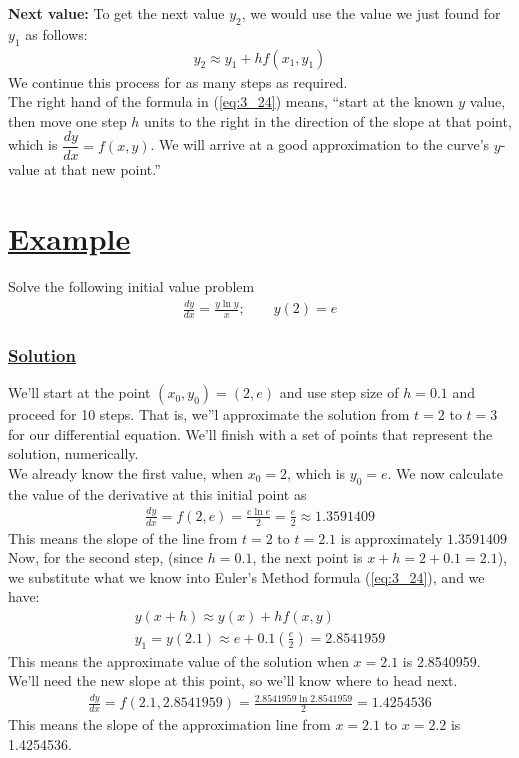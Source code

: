 \documentclass[11pt]{report}
\newcommand{\ubt}[1]{\textbf{\underline{#1}}}
\newcommand{\sps}{\\[0.2cm]}
\newcommand{\refn}[1]{(\ref{#1})}
\newcommand{\refx}[1]{\refn{eq:#1}}
\newcommand{\bt}[1]{\textbf{#1}}
\newcommand{\NI}{\noindent}
\newcommand{\solution}{\subsubsection{\ubt{Solution}}}
\newcommand{\eg}{\section*{\ubt{Example}}}
\begin{document}
	\NI \bt{Next value:} To get the next value $y_2$, we would use the value we just found for $y_1$ as follows:
	\begin{eqnarray*}
		y_2 \approx y_1 + hf(x_1,y_1)
	\end{eqnarray*}
	We continue this process for as many steps as required.\sps
	
	\NI The right hand of the formula in \refx{3_24} means, ``start at the known $y$ value, then move one step $h$ units to the right in the direction of the slope at that point, which is $\dfrac{dy}{dx}=f(x,y)$. We will arrive at a good approximation to the curve's $y$-value at that new point.''
	
	\eg
	Solve the following initial value problem
	\begin{eqnarray*}
		\frac{dy}{dx} = \frac{y\ln y}{x};\qquad y(2) = e
	\end{eqnarray*}
	
	\solution
	We'll start at the point $(x_0,y_0) = (2,e)$ and use step size of $h=0.1$ and proceed for 10 steps. That is, we''l approximate the solution from $t=2$ to $t=3$ for our differential equation. We'll finish with a set of points that represent the solution, numerically.\sps
	We already know the first value, when $x_0=2$, which is $y_0=e$. We now calculate the value of the derivative at this initial point as
	\begin{eqnarray*}
		\frac{dy}{dx} = f(2,e) = \frac{e\ln e}{2} = \frac{e}{2} \approx 1.3591409
	\end{eqnarray*} 
	This means the slope of the line from $t=2$ to $t=2.1$ is approximately $1.3591409$\sps
	
	\NI Now, for the second step, (since $h=0.1$, the next point is $x+h=2+0.1=2.1$), we substitute what we know into Euler's Method formula \refx{3_24}, and we have:
	\begin{eqnarray*}
		y(x+h)\approx y(x) + hf(x,y)\sps
		y_1 = y(2.1) \approx e+0.1\left(\frac{e}{2}\right) = 2.8541959
	\end{eqnarray*}
	This means the approximate value of the solution when $x=2.1$ is 2.8540959. We'll need the new slope at this point, so we'll know where to head next.
	\begin{eqnarray*}
		\frac{dy}{dx} = f(2.1,2.8541959) = \frac{2.8541959\ln 2.8541959}{2} = 1.4254536
	\end{eqnarray*}
	This means the slope of the approximation line from $x=2.1$ to $x=2.2$ is 1.4254536.
	
\end{document}
